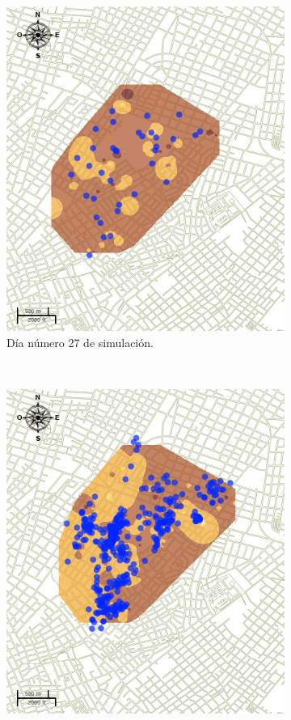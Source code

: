 \begin{figure}[!htbp]
    \begin{subfigure}[b]{0.45\textwidth}
            \includegraphics[width=\textwidth]{capitulo-6/graphics/raster/temp-24-26.png}
            \caption{\label{fig:niveles-infestacion-24-c}Día número 27 de simulación.}
    \end{subfigure}
    ~~
    \begin{subfigure}[b]{0.45\textwidth}
            \includegraphics[width=\textwidth]{capitulo-6/graphics/raster/temp-24-49.png}

\end{subfigure}
\end{figure}
